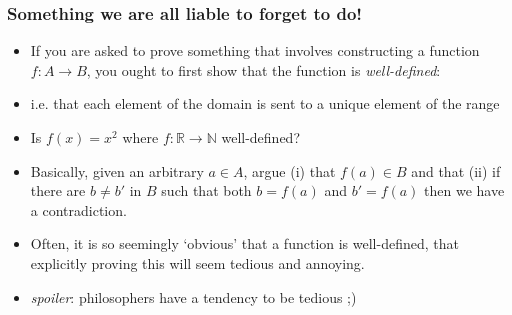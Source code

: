 \begin{frame}
\frametitle{Something we are all liable to forget to do!}

\begin{itemize}[<+->]

\item If you are asked to prove something that involves constructing a function $f: A \rightarrow B$, you ought to first show that the function is \emph{well-defined}:

\item i.e. that each element of the domain is sent to a unique element of the range

\item Is $f(x) = x^2$ where $f: \mathbb{R} \rightarrow \mathbb{N}$ well-defined? 

\item Basically, given an arbitrary $a \in A$, argue (i) that $f(a) \in B$ and that (ii) if there are $b \neq b'$ in $B$ such that both $b = f(a)$ and $b' = f(a)$ then we have a contradiction. 

\item Often, it is so seemingly `obvious' that a function is well-defined, that explicitly proving this will seem tedious and annoying.

\item[] \textit{spoiler}: philosophers have a tendency to be tedious ;) 




\end{itemize}
\end{frame}

